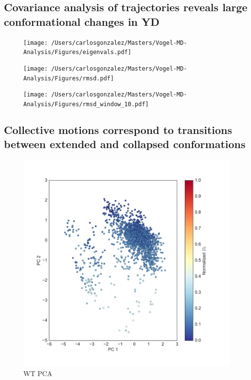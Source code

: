 \subsection{Covariance analysis of trajectories reveals large conformational changes in YD}

\begin{figure}
\centering
\texttt{[image: /Users/carlosgonzalez/Masters/Vogel-MD-Analysis/Figures/eigenvals.pdf]}
\label{eigenvalues}
\end{figure}


\begin{figure}
\centering
\texttt{[image: /Users/carlosgonzalez/Masters/Vogel-MD-Analysis/Figures/rmsd.pdf]}
\label{eigenvalues}
\end{figure}

\begin{figure}
\centering
\texttt{[image: /Users/carlosgonzalez/Masters/Vogel-MD-Analysis/Figures/rmsd\_window\_10.pdf]}
\label{eigenvalues}
\end{figure}

\subsection{Collective motions correspond to transitions between extended and collapsed conformations}

\begin{figure}
\centering
\includegraphics[height=0.5\textheight]{figures/2d_scatter_wt.png}
\caption{WT PCA}
\end{figure}

